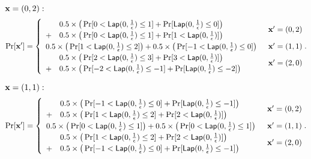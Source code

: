 \documentclass{article}
\begin{document}
{\small
\noindent $\textbf{x} = (0,2):$
\[
\Pr[\textbf{x}']
= \begin{cases}
\begin{array}{ll}
 	& 0.5 \times 
 	\big(
 	\Pr[	0	< \mathsf{Lap}(0, \frac{1}{\epsilon})	\leq	1] 
 	+ 
 	\Pr[	\mathsf{Lap}(0, \frac{1}{\epsilon})			\leq	0] 
 	\big) \\
 	+ 	
 	& 0.5 \times 
 	\big(
 	\Pr[	0	< \mathsf{Lap}(0, \frac{1}{\epsilon})	\leq	1] 
 	+ 
 	\Pr[	1 	< \mathsf{Lap}(0, \frac{1}{\epsilon})] 
 	\big) 
\end{array} 
	& \textbf{x}' = (0, 2)\\
\begin{array}{ll}
 	0.5 \times 
 	\big(
 	\Pr[	1	< \mathsf{Lap}(0, \frac{1}{\epsilon})	\leq	2] 
 	\big)
 	+ 	
 	0.5 \times 
 	\big(
 	\Pr[	-1	< \mathsf{Lap}(0, \frac{1}{\epsilon})	\leq	0] 
 	\big) 
\end{array}  
	& \textbf{x}' = (1, 1)\\
\begin{array}{ll}
 	& 0.5 \times 
 	\big(
 	\Pr[	2	<	\mathsf{Lap}(0, \frac{1}{\epsilon})	\leq	3] 
 	+ 
 	\Pr[	3	<	\mathsf{Lap}(0, \frac{1}{\epsilon})]
 	\big) \\
 	+ 	
 	& 0.5 \times 
 	\big(
 	\Pr[	-2	< \mathsf{Lap}(0, \frac{1}{\epsilon})	\leq	-1] 
 	+ 
 	\Pr[	\mathsf{Lap}(0, \frac{1}{\epsilon})			\leq	-2] 
 	\big) 
\end{array}  
& \textbf{x}' = (2, 0)
\end{cases}.
\]


\noindent $\textbf{x} = (1,1):$
\[
\Pr[\textbf{x}']
= \begin{cases}
\begin{array}{ll}
 	& 0.5 \times 
 	\big(
 	\Pr[	-1	< \mathsf{Lap}(0, \frac{1}{\epsilon})	\leq	0] 
 	+ 
 	\Pr[	\mathsf{Lap}(0, \frac{1}{\epsilon})			\leq	-1] 
 	\big) \\
 	+ 	
 	& 0.5 \times 
 	\big(
 	\Pr[	1	< \mathsf{Lap}(0, \frac{1}{\epsilon})	\leq	2] 
 	+ 
 	\Pr[	2 	< \mathsf{Lap}(0, \frac{1}{\epsilon})] 
 	\big) 
\end{array} 
	& \textbf{x}' = (0, 2)\\
\begin{array}{ll}
 	0.5 \times 
 	\big(
 	\Pr[	0	< \mathsf{Lap}(0, \frac{1}{\epsilon})	\leq	1] 
 	\big)
 	+ 	
 	0.5 \times 
 	\big(
 	\Pr[	0	< \mathsf{Lap}(0, \frac{1}{\epsilon})	\leq	1] 
 	\big) 
\end{array}  
	& \textbf{x}' = (1, 1)\\
\begin{array}{ll}
 	& 0.5 \times 
 	\big(
 	\Pr[	1	<	\mathsf{Lap}(0, \frac{1}{\epsilon})	\leq	2] 
 	+ 
 	\Pr[	2	<	\mathsf{Lap}(0, \frac{1}{\epsilon})]
 	\big) \\
 	+ 	
 	& 0.5 \times 
 	\big(
 	\Pr[	-1	< \mathsf{Lap}(0, \frac{1}{\epsilon})	\leq	0] 
 	+ 
 	\Pr[	\mathsf{Lap}(0, \frac{1}{\epsilon})			\leq	-1] 
 	\big) 
\end{array}  
& \textbf{x}' = (2, 0)
\end{cases}.
\]

}
\end{document}
